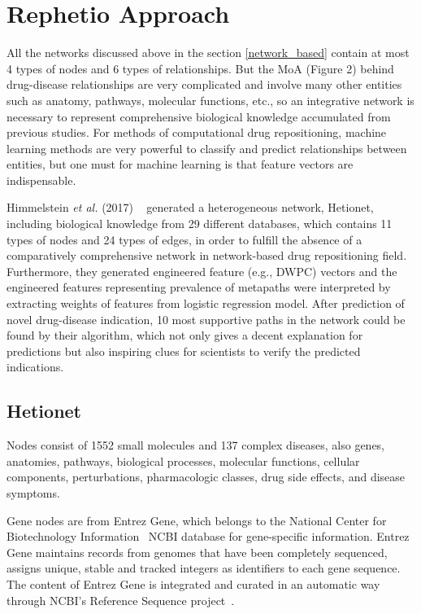 \section{Rephetio Approach}

All the networks discussed above in the section \ref{network_based} contain at most 4 types of nodes and 6 types of relationships. But the \ac{MoA} (Figure 2) behind drug-disease relationships are very complicated and involve many other entities such as anatomy, pathways, molecular functions, etc., so an integrative network is necessary to represent comprehensive biological knowledge accumulated from previous studies. For methods of computational drug repositioning, machine learning methods are very powerful to classify and predict relationships between entities, but one must for machine learning is that feature vectors are indispensable.

Himmelstein \textit{et al.} (2017) ~\cite{himmelstein_systematic_2017} generated a heterogeneous network, Hetionet, including biological knowledge from 29 different databases, which contains 11 types of nodes and 24 types of edges, in order to fulfill the absence of a comparatively comprehensive network in network-based drug repositioning field. Furthermore, they generated engineered feature (e.g., DWPC) vectors and the engineered features representing prevalence of metapaths were interpreted by extracting weights of features from logistic regression model. After prediction of novel drug-disease indication, 10 most supportive paths in the network could be found by their algorithm, which not only gives a decent explanation for predictions but also inspiring clues for scientists to verify the predicted indications.

\subsection{Hetionet}

Nodes consist of 1552 small molecules and 137 complex diseases, also genes, anatomies, pathways, biological processes, molecular functions, cellular components, perturbations, pharmacologic classes, drug side effects, and disease symptoms.

Gene nodes are from Entrez Gene, which belongs to the National Center for Biotechnology Information ~\ac{NCBI} database for gene-specific information. Entrez Gene maintains records from genomes that have been completely sequenced, assigns unique, stable and tracked integers as identifiers to each gene sequence. The content of Entrez Gene is integrated and curated in an automatic way through NCBI's Reference Sequence project~\cite{maglott_entrez_2011}.

